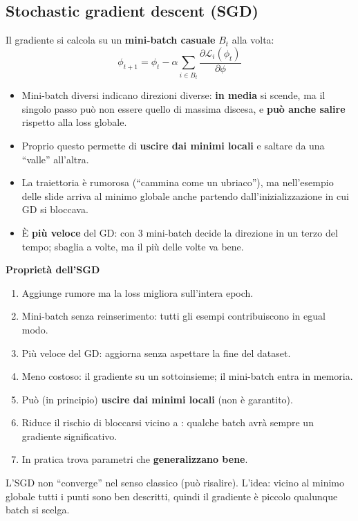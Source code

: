 \subsection{Stochastic gradient descent (SGD)}
Il gradiente si calcola su un \textbf{mini-batch casuale} $B_t$ alla volta:
\[
\phi_{t+1} = \phi_t - \alpha \sum_{i\in B_t}\frac{\partial \mathcal{L}_i(\phi_t)}{\partial\phi}
\]
\begin{itemize}
  \item Mini-batch diversi indicano direzioni diverse: \textbf{in media} si scende, ma il singolo passo può non essere quello
        di massima discesa, e \textbf{può anche salire} rispetto alla loss globale.
  \item Proprio questo permette di \textbf{uscire dai minimi locali} e saltare da una ``valle'' all'altra.
  \item La traiettoria è rumorosa (``cammina come un ubriaco''), ma nell'esempio delle slide arriva al minimo globale
        anche partendo dall'inizializzazione in cui GD si bloccava.
  \item È \textbf{più veloce} del GD: con 3 mini-batch decide la direzione in un terzo del tempo; sbaglia a volte, ma
        il più delle volte va bene.
\end{itemize}

\textbf{Proprietà dell'SGD}
\begin{enumerate}
  \item Aggiunge rumore ma la loss migliora sull'intera epoch.
  \item Mini-batch senza reinserimento: tutti gli esempi contribuiscono in egual modo.
  \item Più veloce del GD: aggiorna senza aspettare la fine del dataset.
  \item Meno costoso: il gradiente su un sottoinsieme; il mini-batch entra in memoria.
  \item Può (in principio) \textbf{uscire dai minimi locali} (non è garantito).
  \item Riduce il rischio di bloccarsi vicino a : qualche batch avrà sempre un gradiente significativo.
  \item In pratica trova parametri che \textbf{generalizzano bene}.
\end{enumerate}
\begin{attenzione}
L'SGD non ``converge'' nel senso classico (può risalire). L'idea: vicino al minimo globale tutti i punti sono ben
descritti, quindi il gradiente è piccolo qualunque batch si scelga.
\end{attenzione}

